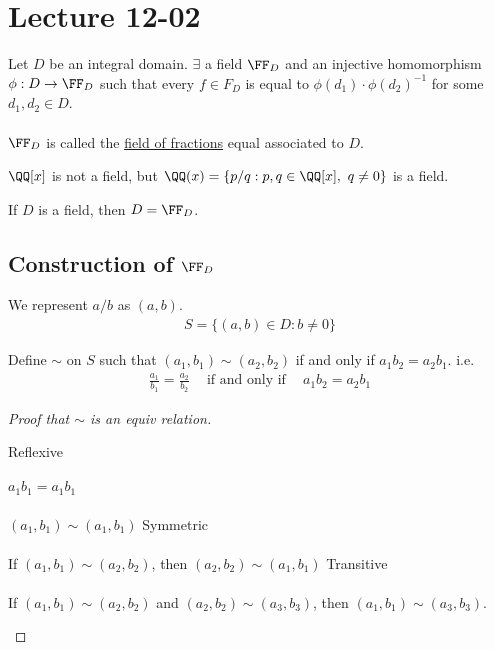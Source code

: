 \documentclass[class=scrartcl, crop=false]{standalone}
\date{2019-12-02}
\begin{document}
\section{Lecture 12-02}

\begin{theorem}
  Let $D$ be an integral domain. $\exists$ a field $\FF_D$ and an injective homomorphism $\phi: D \to \FF_D$ such that every $f \in F_D$ is equal to $\phi(d_1) \cdot \phi(d_2)^{-1}$ for some $d_1, d_2 \in D$.
  \\\\
  $\FF_D$ is called the \ul{field of fractions} equal associated to $D$.
\end{theorem} 

\begin{example}
  $\QQ[x]$ is not a field, but $\QQ(x) = \{p / q : p, q \in \QQ[x], \ q \neq 0 \}$ is a field.
\end{example} 
\begin{example}
  If $D$ is a field, then $D = \FF_D$.
\end{example} 

\subsection{Construction of $\FF_D$ }

We represent $a / b$ as $(a, b)$.
\begin{gather*}
  S = \{(a, b) \in D : b \neq 0\}
\end{gather*} 

Define $\sim $ on $S$ such that $(a_1, b_1) \sim (a_2, b_2)$ if and only if $a_1b_2 = a_2b_1$. i.e. 
\begin{gather*}
  \frac{a_1}{b_1} = \frac{a_2}{b_2} \quad \ \text{if and only if} \ \quad a_1b_2 = a_2b_1
\end{gather*} 

\begin{proof}[Proof that $\sim$ is an equiv relation]
  \begin{enumerate}
    \ii[]
    \ii
    Reflexive
    \\\\
    $a_1b_1 = a_1b_1$
    \\\\
    $(a_1, b_1) \sim (a_1, b_1)$ 
    \ii
    Symmetric
    \\\\
    If $(a_1, b_1) \sim (a_2, b_2)$, then $(a_2, b_2) \sim (a_1, b_1)$ 
    \ii
    Transitive
    \\\\
    If $(a_1, b_1) \sim (a_2, b_2)$ and $(a_2, b_2) \sim (a_3, b_3)$, then $(a_1, b_1) \sim (a_3, b_3)$.
  \end{enumerate} 
\end{proof} 
\end{document}
